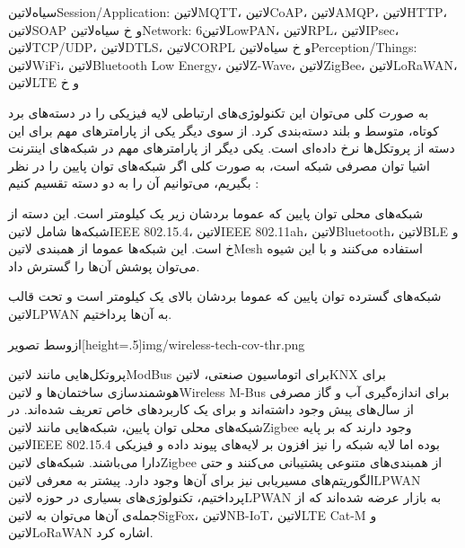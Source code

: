  ‌سیاه{‌لاتین{Session/Application}}: ‌لاتین{MQTT}، ‌لاتین{CoAP}، ‌لاتین{AMQP}، ‌لاتین{HTTP}، ‌لاتین{SOAP} و ‌خ
 ‌سیاه{‌لاتین{Network}}: ‌لاتین{6LowPAN}، ‌لاتین{RPL}، ‌لاتین{IPsec}، ‌لاتین{TCP/UDP}، ‌لاتین{DTLS}، ‌لاتین{CORPL} و ‌خ
 ‌سیاه{‌لاتین{Perception/Things}}: ‌لاتین{WiFi}، ‌لاتین{Bluetooth Low Energy}، ‌لاتین{Z-Wave}، ‌لاتین{ZigBee}، ‌لاتین{LoRaWAN}، ‌لاتین{LTE} و ‌خ

به صورت کلی می‌توان این تکنولوژی‌های ارتباطی لایه فیزیکی را در دسته‌های برد کوتاه، متوسط و بلند دسته‌بندی کرد.
از سوی دیگر یکی از پارامترهای مهم برای این دسته از پروتکل‌ها نرخ داده‌ای است. یکی دیگر از پارامترهای مهم در شبکه‌های اینترنت اشیا توان مصرفی شبکه است، به صورت کلی اگر شبکه‌های توان پایین را
در نظر بگیریم، می‌توانیم آن را به دو دسته تقسیم کنیم :

 شبکه‌های محلی توان پایین که عموما بردشان زیر یک کیلومتر است. این دسته از شبکه‌ها شامل ‌لاتین{IEEE 802.15.4}، ‌لاتین{IEEE 802.11ah}، ‌لاتین{Bluetooth}، ‌لاتین{BLE} و ‌خ است.
این شبکه‌ها عموما از همبندی ‌لاتین{Mesh} استفاده می‌کنند و با این شیوه می‌توان پوشش آن‌ها را گسترش داد.

 شبکه‌های گسترده توان پایین که عموما بردشان بالای یک کیلومتر است و تحت قالب ‌لاتین{LPWAN} به آن‌ها پرداختیم.

‌ازوسط
‌تصویر[height=.5\textwidth]{img/wireless-tech-cov-thr.png}

پروتکل‌هایی مانند ‌لاتین{ModBus} برای اتوماسیون صنعتی، ‌لاتین{KNX} برای هوشمند‌سازی ساختمان‌ها و ‌لاتین{Wireless M-Bus} برای اندازه‌گیری آب و گاز مصرفی از سال‌های پیش وجود داشته‌اند
و برای یک کاربردهای خاص تعریف شده‌اند.
در شبکه‌های محلی توان پایین، شبکه‌هایی مانند ‌لاتین{Zigbee} وجود دارند که بر پایه ‌لاتین{IEEE 802.15.4} بوده اما لایه شبکه را نیز افزون بر لایه‌های پیوند داده و فیزیکی دارا می‌باشند. شبکه‌های ‌لاتین{Zigbee}
از همبندی‌های متنوعی پشتیبانی می‌کنند و حتی الگوریتم‌های مسیریابی نیز برای آن‌ها وجود دارد.
پیشتر به معرفی ‌لاتین{LPWAN} پرداختیم، تکنولوژی‌های بسیاری در حوزه ‌لاتین{LPWAN} به بازار عرضه شده‌اند که از جمله‌ی آن‌ها می‌توان به ‌لاتین{SigFox}، ‌لاتین{NB-IoT}، ‌لاتین{LTE Cat-M} و ‌لاتین{LoRaWAN}
اشاره کرد.

